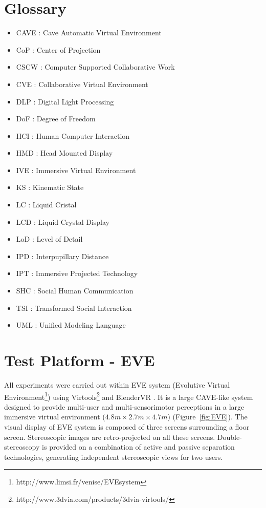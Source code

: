 \begin{appendices}
\appendixpage
\noappendicestocpagenum
\addappheadtotoc

\chapter{Glossary}
\label{appendix:glossary}
\begin{multicols}{2}
\begin{itemize}
  \item CAVE : Cave Automatic Virtual Environment
  \item CoP : Center of Projection
  \item CSCW : Computer Supported Collaborative Work
  \item CVE : Collaborative Virtual Environment
  \item DLP : Digital Light Processing
  \item DoF : Degree of Freedom
  \item HCI : Human Computer Interaction
  \item HMD : Head Mounted Display
  \item IVE : Immersive Virtual Environment
  \item KS  : Kinematic State
  \item LC  : Liquid Cristal
  \item LCD : Liquid Crystal Display
  \item LoD : Level of Detail
  \item IPD : Interpupillary Distance
  \item IPT : Immersive Projected Technology
  \item SHC : Social Human Communication
  \item TSI : Transformed Social Interaction
  \item UML : Unified Modeling Language
\end{itemize}
\end{multicols}

\chapter{Test Platform - EVE}
\label{appendix:platform}
All experiments were carried out within EVE system (Evolutive Virtual Environment\footnote{http://www.limsi.fr/venise/EVEsystem}) using Virtools\footnote{http://www.3dvia.com/products/3dvia-virtools/} and BlenderVR \citep{BlenderVR2015}. It is a large CAVE-like system designed to provide multi-user and multi-sensorimotor perceptions in a large immersive virtual environment ($4.8m\times2.7m\times4.7m$) (Figure~\ref{fig:EVE}). The visual display of EVE system is composed of three screens surrounding a floor screen. Stereoscopic images are retro-projected on all these screens. Double-stereoscopy is provided on a combination of active and passive separation technologies, generating independent stereoscopic views for two users.


\end{appendices}

